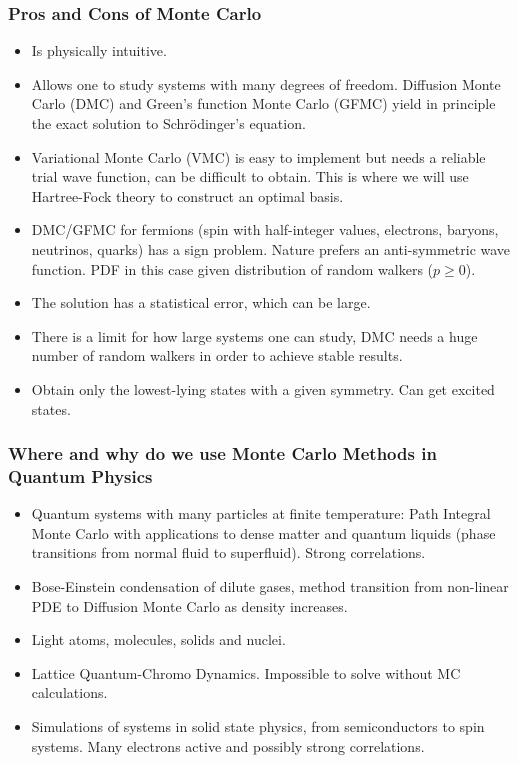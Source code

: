 \documentclass[compress]{beamer}
\begin{document}
\frame
{
  \frametitle{Pros and Cons of Monte Carlo}
\begin{small}
{\scriptsize
\begin{itemize} 
\item Is physically intuitive.
\item Allows one to study systems with many degrees of freedom. Diffusion Monte Carlo (DMC) and Green's function Monte Carlo (GFMC) yield
in principle the exact solution to Schr\"odinger's equation.
\item Variational Monte Carlo (VMC) is easy  to implement but needs 
a reliable trial wave function, can be difficult to obtain.  This is where we will use Hartree-Fock theory to construct
an optimal basis.
\item DMC/GFMC for fermions (spin with half-integer values, electrons, baryons, neutrinos, quarks) 
has a sign problem. Nature prefers an anti-symmetric wave function. PDF in this case given
distribution of random walkers ($p\ge 0$).
\item The solution has a statistical error, which can be large. 
\item There is a limit for how large systems one can study, DMC needs a huge number of random walkers
in order to achieve stable results. 
\item Obtain only the lowest-lying states with a given symmetry. Can get excited states.
\end{itemize}
}
\end{small}
}




\frame
{
  \frametitle{Where and why do we use Monte Carlo Methods in Quantum Physics}
\begin{small}
{\scriptsize
\begin{itemize} 
\item Quantum systems with many particles at finite temperature: Path Integral 
Monte Carlo with applications to dense matter and quantum liquids (phase transitions from
normal fluid to superfluid). Strong correlations.
\item Bose-Einstein condensation of dilute gases, method transition from 
non-linear PDE to Diffusion Monte Carlo as density increases.
\item Light atoms, molecules, solids and nuclei. 
\item Lattice Quantum-Chromo Dynamics. Impossible to solve without MC calculations. 
\item Simulations of systems in solid state physics, from semiconductors to 
spin systems. Many electrons active and possibly strong correlations.
\end{itemize}
}
\end{small}
}
\end{document}
